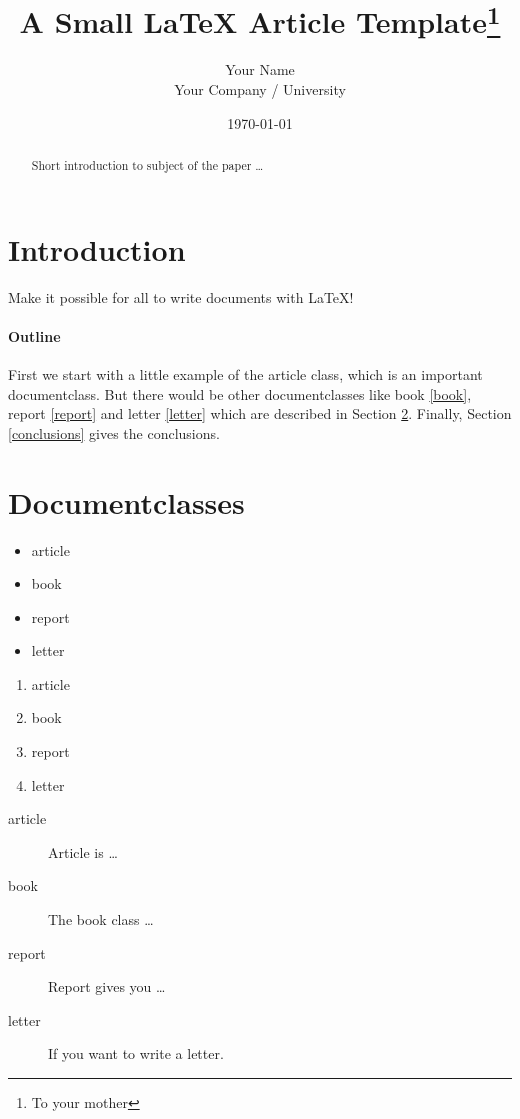 \documentclass{article}
\title{A Small \LaTeX{} Article Template\thanks{To your mother}}
\author{Your Name  \\
	Your Company / University  \\
	}
\date{\today}
\begin{document}
\maketitle


\begin{abstract}
Short introduction to subject of the paper \ldots
\end{abstract}

\section{Introduction}
Make it possible for all to write documents with \LaTeX{}!

\paragraph{Outline}
First we start with a little example of the article class, which is an
important documentclass. But there would be other documentclasses like
book \ref{book}, report \ref{report} and letter \ref{letter} which are
described in Section \ref{documentclasses}. Finally, Section
\ref{conclusions} gives the conclusions.



\section{Documentclasses} \label{documentclasses}

\begin{itemize}
\item article
\item book
\item report
\item letter
\end{itemize}

\begin{enumerate}
\item article
\item book
\item report
\item letter
\end{enumerate}

\begin{description}
\item[article\label{article}]{Article is \ldots}
\item[book\label{book}]{The book class \ldots}
\item[report\label{report}]{Report gives you \ldots}
\item[letter\label{letter}]{If you want to write a letter.}
\end{description}
\end{document}
